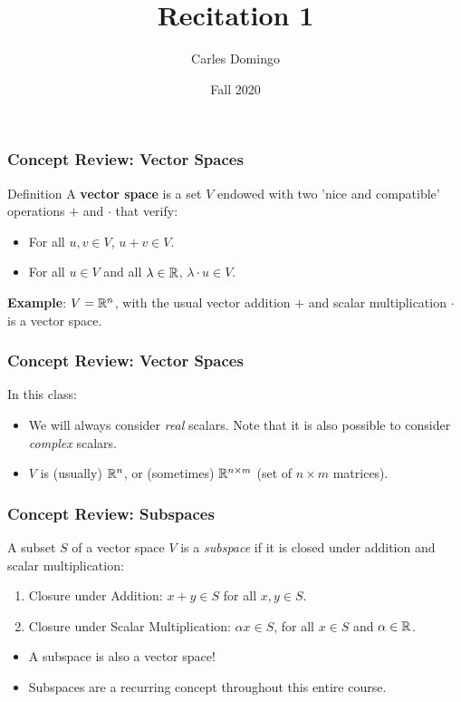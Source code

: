\documentclass{beamer}
\title{Recitation 1}
\author{Carles Domingo}
\date{Fall 2020}
\begin{document}
\frame{\titlepage} 

\setcounter{showProgressBar}{0}
\setcounter{showSlideNumbers}{1}

\begin{frame}[t]
	\frametitle{Concept Review: Vector Spaces}
	\begin{block}{Definition}
		A \textbf{vector space} is a set $V$ endowed with two 'nice and compatible' operations $+$ and $\cdot$ that verify:
		\begin{itemize}
			\item For all $u,v \in V$, $u+v \in V$.
			\item For all $u \in V$ and all $\lambda \in \mathbb{R}$, $\lambda \cdot u \in V$.
		\end{itemize}
	\end{block}
	\textbf{Example}: $V = \mathbb{R}^n$, with the usual vector addition $+$ and scalar multiplication $\cdot$ is a vector space.
\end{frame}

\begin{frame}
	\frametitle{Concept Review: Vector Spaces}
	In this class:
	\begin{itemize}
		\item We will always consider \emph{real} scalars. Note that it is also possible to consider \emph{complex} scalars.
			\vspace{0.6cm}
		\item $V$ is (usually) $\mathbb{R}^n$, or (sometimes) $\mathbb{R}^{n\times m}$ (set of $n \times m$ matrices).
	\end{itemize}

\end{frame}

\begin{frame}[t]
	\frametitle{Concept Review: Subspaces}
	\begin{definition}[Subspace]
		A subset $S$ of a vector space $V$ is a \emph{subspace} if it is closed under addition and scalar multiplication:
		\begin{enumerate}
			\item Closure under Addition: $x+y \in S$  for all $x,y \in S$.
			\item Closure under Scalar Multiplication: $\alpha x \in S$, for all $x \in S$ and $\alpha \in \mathbb{R}$.
		\end{enumerate}
	\end{definition}
	\begin{itemize}
		\item A subspace is also a vector space!
		\item Subspaces are a recurring concept throughout this entire course.
	\end{itemize}
\end{frame}
\end{document}
